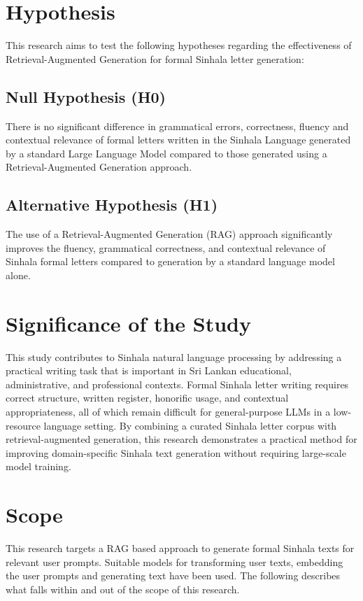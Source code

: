 \documentclass[12pt]{uomthesis}
\begin{document}
\section{Hypothesis}

This research aims to test the following hypotheses regarding the effectiveness of Retrieval-Augmented Generation for formal Sinhala letter generation:

\subsection{Null Hypothesis (H0)}
There is no significant difference in grammatical errors, correctness, fluency and contextual relevance of formal letters written in the Sinhala Language generated by a standard Large Language Model compared to those generated using a Retrieval-Augmented Generation approach.

\subsection{Alternative Hypothesis (H1)}
The use of a Retrieval-Augmented Generation (RAG) approach significantly improves the fluency, grammatical correctness, and contextual relevance of Sinhala formal letters compared to generation by a standard language model alone.

\section{Significance of the Study}

This study contributes to Sinhala natural language processing by addressing a practical writing task that is important in Sri Lankan educational, administrative, and professional contexts. Formal Sinhala letter writing requires correct structure, written register, honorific usage, and contextual appropriateness, all of which remain difficult for general-purpose LLMs in a low-resource language setting. By combining a curated Sinhala letter corpus with retrieval-augmented generation, this research demonstrates a practical method for improving domain-specific Sinhala text generation without requiring large-scale model training.

\section{Scope}
This research targets a RAG based approach to generate formal Sinhala texts for relevant user prompts. Suitable models for transforming user texts, embedding the user prompts and generating text have been used. The following describes what falls within and out of the scope of this research.
\end{document}
